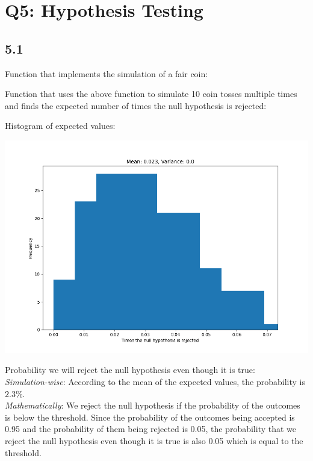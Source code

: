 \documentclass[answers]{exam}
\begin{document}
\pagebreak
\section*{Q5: Hypothesis Testing}
\subsection*{5.1}
Function that implements the simulation of a fair coin:

Function that uses the above function to simulate 10 coin tosses multiple times and finds the expected number of times the null hypothesis is rejected:

Histogram of expected values:
\begin{center}
  \includegraphics[scale = 0.5]{Q5_histograms/Q5.1.png}
\end{center}
Probability we will reject the null hypothesis even though it is true:\\
\emph{Simulation-wise}: According to the mean of the expected values, the probability is $2.3\%$.\\
\emph{Mathematically}: We reject the null hypothesis if the probability of the outcomes is below the threshold. Since the probability of the outcomes being accepted is 0.95 and the probability of them being rejected is 0.05, the probability that we reject the null hypothesis even though it is true is also 0.05 which is equal to the threshold.
\end{document}
